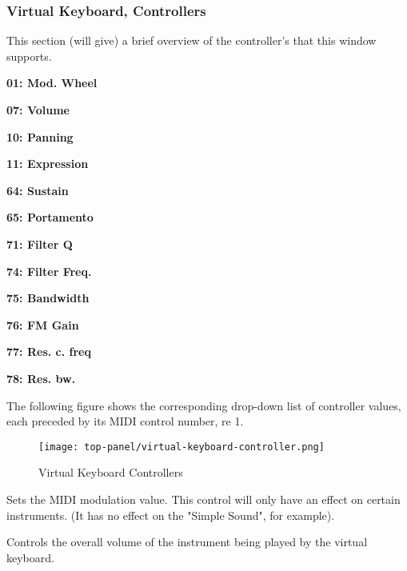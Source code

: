 \subsubsection{Virtual Keyboard, Controllers}
\label{subsubsec:virtual_keyboard_controllers}

   This section (will give) a brief overview of the controller's that this
   window supports.

   \begin{enumber}
      \item \textbf{01: Mod. Wheel}
      \item \textbf{07: Volume}
      \item \textbf{10: Panning}
      \item \textbf{11: Expression}
      \item \textbf{64: Sustain}
      \item \textbf{65: Portamento}
      \item \textbf{71: Filter Q}
      \item \textbf{74: Filter Freq.}
      \item \textbf{75: Bandwidth}
      \item \textbf{76: FM Gain}
      \item \textbf{77: Res. c. freq}
      \item \textbf{78: Res. bw.}
   \end{enumber}

      The following figure shows the corresponding drop-down list of controller
      values, each preceded by its MIDI control number, re 1.

\begin{figure}[H]
   \centering
   \texttt{[image: top-panel/virtual-keyboard-controller.png]}
   \caption{Virtual Keyboard Controllers}
   \label{fig:virtual_keyboard_controllers}
\end{figure}

   \setcounter{ItemCounter}{0}      %

   Sets the MIDI modulation value.  This control will
   only have an effect on certain instruments.  (It has no effect on the
   "Simple Sound", for example).

   Controls the overall volume of the instrument being played by the virtual
   keyboard.


